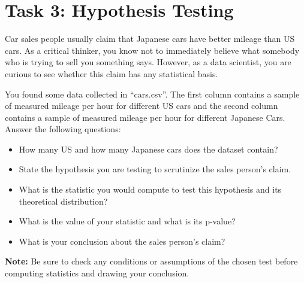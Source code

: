 \documentclass[11pt]{article}
\begin{document}
\newpage
\section*{Task 3: Hypothesis Testing}

Car sales people usually claim that Japanese cars have better mileage than US cars. As a critical thinker, you know not to immediately believe what somebody who is trying to sell you something says. However, as a data scientist,
you are curious to see whether this claim has any statistical basis. 

You found some data collected in “cars.csv”.  The first
column contains a sample of measured mileage per hour for different US cars and the second column contains a sample of measured mileage per hour for different Japanese Cars. 
Answer the following questions: 
\begin{itemize}
    \item[(a)] How many US and how many Japanese cars does the dataset contain? 
    \item[(b)] State the hypothesis you are testing to scrutinize the sales person's claim.
    \item[(c)] What is the statistic you would compute to test this hypothesis and its theoretical distribution?
    \item[(d)] What is the value of your statistic and what is its p-value?
    \item[(e)] What is your conclusion about the sales person's claim?
\end{itemize}
\textbf{Note:} Be sure to check any conditions or assumptions of the chosen test before computing statistics and drawing your conclusion.
\end{document}
